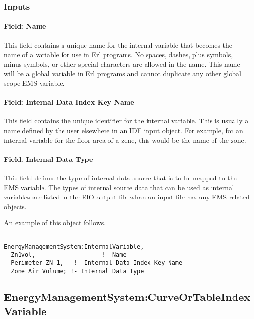 \subsubsection{Inputs}\label{inputs-8-006}

\paragraph{Field: Name}\label{field-name-8-005}

This field contains a unique name for the internal variable that becomes the name of a variable for use in Erl programs. No spaces, dashes, plus symbols, minus symbols, or other special characters are allowed in the name. This name will be a global variable in Erl programs and cannot duplicate any other global scope EMS variable.

\paragraph{Field: Internal Data Index Key Name}\label{field-internal-data-index-key-name}

This field contains the unique identifier for the internal variable. This is usually a name defined by the user elsewhere in an IDF input object. For example, for an internal variable for the floor area of a zone, this would be the name of the zone.

\paragraph{Field: Internal Data Type}\label{field-internal-data-type}

This field defines the type of internal data source that is to be mapped to the EMS variable. The types of internal source data that can be used as internal variables are listed in the EIO output file whan an input file has any EMS-related objects.

An example of this object follows.

\begin{lstlisting}

EnergyManagementSystem:InternalVariable,
  Zn1vol,                   !- Name
  Perimeter_ZN_1,   !- Internal Data Index Key Name
  Zone Air Volume; !- Internal Data Type
\end{lstlisting}

\subsection{EnergyManagementSystem:CurveOrTableIndexVariable}\label{energymanagementsystemcurveortableindexvariable}

